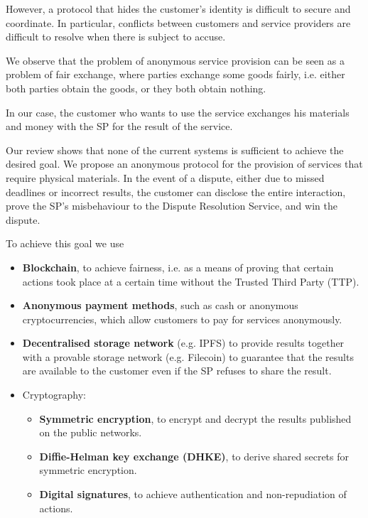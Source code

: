 \documentclass[pdftex,twocolumn,epjc3]{svjour3}
\begin{document}
However, a protocol that hides the customer's identity is difficult to secure and coordinate. In particular, conflicts between customers and service providers are difficult to resolve when there is subject to accuse.

We observe that the problem of anonymous service provision can be seen as a problem of fair exchange, where parties exchange some goods fairly, i.e. either both parties obtain the goods, or they both obtain nothing.

In our case, the customer who wants to use the service exchanges his materials and money with the SP for the result of the service.

Our review shows that none of the current systems is sufficient to achieve the desired goal. We propose an anonymous protocol for the provision of services that require physical materials. In the event of a dispute, either due to missed deadlines or incorrect results, the customer can disclose the entire interaction, prove the SP's misbehaviour to the Dispute Resolution Service, and win the dispute.

To achieve this goal we use
\begin{itemize}
    \item \textbf{Blockchain}, to achieve fairness, i.e. as a means of proving that certain actions took place at a certain time without the Trusted Third Party (TTP).
    \item \textbf{Anonymous payment methods}, such as cash or anonymous cryptocurrencies, which allow customers to pay for services anonymously.
    \item \textbf{Decentralised storage network} (e.g. IPFS) to provide results together with a provable storage network (e.g. Filecoin) to guarantee that the results are available to the customer even if the SP refuses to share the result.
    
    \item Cryptography:
    \begin{itemize}
        \item \textbf{Symmetric encryption}, to encrypt and decrypt the results published on the public networks.
        \item \textbf{Diffie-Helman key exchange (DHKE)}, to derive shared secrets for symmetric encryption.
        \item \textbf{Digital signatures}, to achieve authentication and non-repudiation of actions. 
    \end{itemize}
    
\end{itemize}
\end{document}
